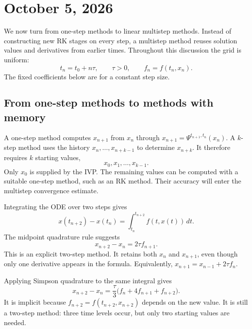 \section{October 5, 2026}

We now turn from one-step methods to linear multistep methods.
Instead of constructing new RK stages on every step, a multistep
method reuses solution values and derivatives from earlier times.
Throughout this discussion the grid is uniform:
\[
 t_n=t_0+n\tau,\qquad \tau>0,\qquad f_n=f(t_n,x_n).
\]
The fixed coefficients below are for a constant step size.

\subsection{From one-step methods to methods with memory}

A one-step method computes \(x_{n+1}\) from \(x_n\) through
\(x_{n+1}=\Psi^{t_{n+1},t_n}(x_n)\). A \(k\)-step method uses
the history \(x_n,\ldots,x_{n+k-1}\) to determine \(x_{n+k}\).
It therefore requires \(k\) starting values,
\[
 x_0,x_1,\ldots,x_{k-1}.
\]
Only \(x_0\) is supplied by the IVP. The remaining values can be
computed with a suitable one-step method, such as an RK method.
Their accuracy will enter the multistep convergence estimate.

\begin{example}
 Integrating the ODE over two steps gives
 \[
  x(t_{n+2})-x(t_n)=\int_{t_n}^{t_{n+2}}f(t,x(t))\,dt.
 \]
 The midpoint quadrature rule suggests
 \begin{equation}\label{eq:leapfrog-oct-05}
  \boxed{x_{n+2}-x_n=2\tau f_{n+1}.}
 \end{equation}
 This is an explicit two-step method. It retains both \(x_n\)
 and \(x_{n+1}\), even though only one derivative appears in the
 formula. Equivalently,
 \(x_{n+1}=x_{n-1}+2\tau f_n\).
\end{example}

\begin{example}
 Applying Simpson quadrature to the same integral gives
 \begin{equation}\label{eq:simpson-lmm-oct-05}
  \boxed{x_{n+2}-x_n
       =\frac\tau3\bigl(f_n+4f_{n+1}+f_{n+2}\bigr).}
 \end{equation}
 It is implicit because \(f_{n+2}=f(t_{n+2},x_{n+2})\)
 depends on the new value. It is still a two-step method:
 three time levels occur, but only two starting values are needed.
\end{example}

